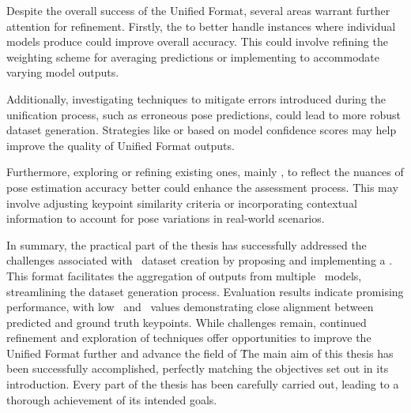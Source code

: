 Despite the overall success of the Unified Format, several areas warrant further attention for refinement. Firstly,  the  to better handle instances where individual models produce  could improve overall accuracy. This could involve refining the weighting scheme for averaging predictions or implementing  to accommodate varying model outputs.

Additionally, investigating techniques to mitigate errors introduced during the unification process, such as erroneous pose predictions, could lead to more robust dataset generation. Strategies like  or  based on model confidence scores may help improve the quality of Unified Format outputs.

Furthermore, exploring  or refining existing ones, mainly \pojem{\OKS}, to reflect the nuances of pose estimation accuracy better could enhance the assessment process. This may involve adjusting keypoint similarity criteria or incorporating contextual information to account for pose variations in real-world scenarios.

In summary, the practical part of the thesis has successfully addressed the challenges associated with \HPE\ dataset creation by proposing and implementing a . This format facilitates the aggregation of outputs from multiple \NN\ models, streamlining the dataset generation process. Evaluation results indicate promising performance, with low \APE\ and \MSE\ values demonstrating close alignment between predicted and ground truth keypoints. While challenges remain, continued refinement and exploration of techniques offer opportunities to improve the Unified Format further and advance the field of \HPE\. The main aim of this thesis has been successfully accomplished, perfectly matching the objectives set out in its introduction. Every part of the thesis has been carefully carried out, leading to a thorough achievement of its intended goals.
